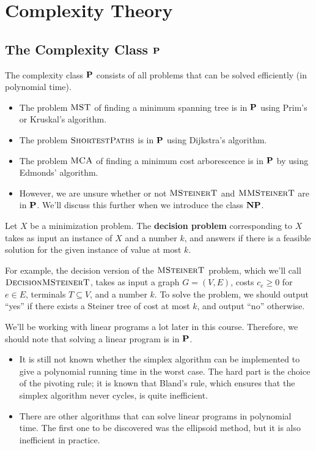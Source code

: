 \section{Complexity Theory} \label{sec:6}

\subsection{The Complexity Class $\mathbf{P}$} \label{subsec:6.1}
The complexity class $\mathbf{P}$ consists of all problems that can be solved
efficiently (in polynomial time). 
\begin{itemize}
    \item The problem $\textsc{MST}$ of finding a minimum spanning tree is in $\mathbf{P}$ 
    using Prim's or Kruskal's algorithm. 
    \item The problem $\textsc{ShortestPaths}$ is in $\mathbf{P}$ using Dijkstra's algorithm.
    \item The problem $\textsc{MCA}$ of finding a minimum cost arborescence is in 
    $\mathbf{P}$ by using Edmonds' algorithm. 
    \item However, we are unsure whether or not $\textsc{MSteinerT}$ and $\textsc{MMSteinerT}$
    are in $\mathbf{P}$. We'll discuss this further when we introduce the class $\mathbf{NP}$.
\end{itemize}

Let $X$ be a minimization problem. The {\bf decision problem} corresponding 
to $X$ takes as input an instance of $X$ and a number $k$, and answers 
if there is a feasible solution for the given instance of value at most $k$. 

For example, the decision version of the $\textsc{MSteinerT}$ problem, 
which we'll call $\textsc{DecisionMSteinerT}$, takes as input a graph 
$G = (V, E)$, costs $c_e \geq 0$ for $e \in E$, terminals $T \subseteq V$, 
and a number $k$. To solve the problem, we should output ``yes'' if there 
exists a Steiner tree of cost at most $k$, and output ``no'' otherwise. 

We'll be working with linear programs a lot later in this course. Therefore, 
we should note that solving a linear program is in $\mathbf{P}$. 
\begin{itemize}
    \item It is still not known whether the simplex algorithm can be implemented 
    to give a polynomial running time in the worst case. The hard part is the choice of 
    the pivoting rule; it is known that Bland's rule, which ensures that 
    the simplex algorithm never cycles, is quite inefficient.
    \item There are other algorithms that can solve linear programs in 
    polynomial time. The first one to be discovered was the ellipsoid method, 
    but it is also inefficient in practice. 
\end{itemize} 

